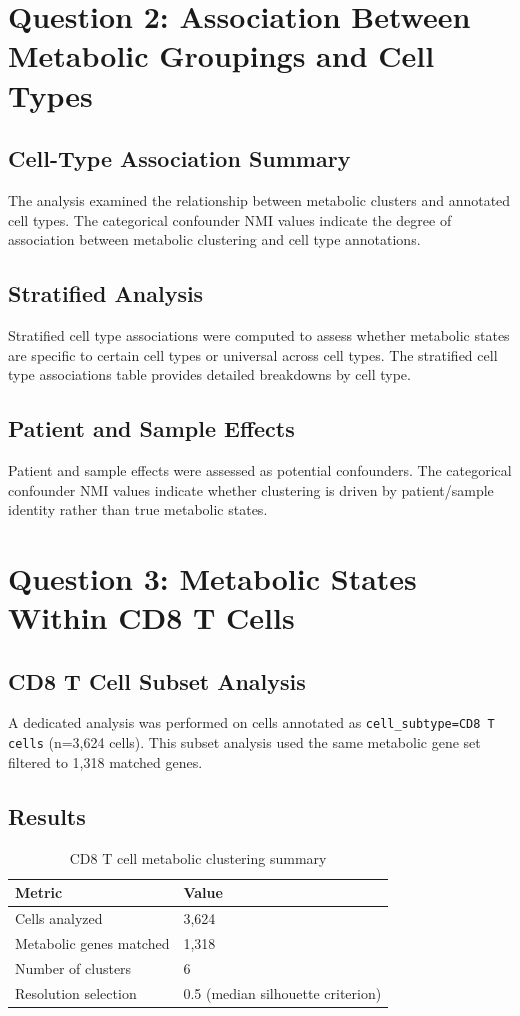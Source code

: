 \documentclass[11pt]{article}
\begin{document}
\section{Question 2: Association Between Metabolic Groupings and Cell Types}

\subsection{Cell-Type Association Summary}
The analysis examined the relationship between metabolic clusters and annotated cell types. The categorical confounder NMI values indicate the degree of association between metabolic clustering and cell type annotations.

\subsection{Stratified Analysis}
Stratified cell type associations were computed to assess whether metabolic states are specific to certain cell types or universal across cell types. The stratified cell type associations table provides detailed breakdowns by cell type.

\subsection{Patient and Sample Effects}
Patient and sample effects were assessed as potential confounders. The categorical confounder NMI values indicate whether clustering is driven by patient/sample identity rather than true metabolic states.

\section{Question 3: Metabolic States Within CD8 T Cells}

\subsection{CD8 T Cell Subset Analysis}
A dedicated analysis was performed on cells annotated as \texttt{cell\_subtype=CD8 T cells} (n=3,624 cells). This subset analysis used the same metabolic gene set filtered to 1,318 matched genes.

\subsection{Results}
\begin{table}[h]
\centering
\caption{CD8 T cell metabolic clustering summary}
\label{tab:cd8_summary}
\begin{tabular}{ll}
\toprule
\textbf{Metric} & \textbf{Value} \\
\midrule
Cells analyzed & 3,624 \\
Metabolic genes matched & 1,318 \\
Number of clusters & 6 \\
Resolution selection & 0.5 (median silhouette criterion) \\
\bottomrule
\end{tabular}
\end{table}
\end{document}
